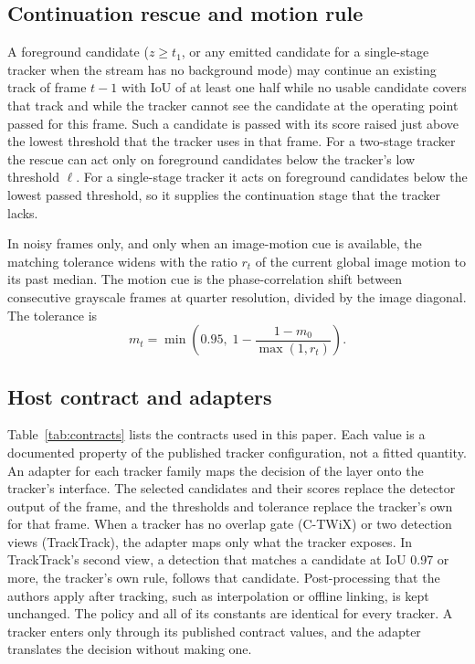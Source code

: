 \subsection{Continuation rescue and motion rule}\label{sec:rescue}
A foreground candidate ($z\ge t_1$, or any emitted candidate for a
single-stage tracker when the stream has no background mode) may continue an
existing track of frame $t-1$ with IoU of at least one half while no usable candidate covers that
track and while the tracker cannot see the candidate at the operating point
passed for this frame. Such a candidate is passed with its score raised just
above the lowest threshold that the tracker uses in that frame. For a
two-stage tracker the rescue can act only on foreground candidates below the
tracker's low threshold $\ell$. For a single-stage tracker it acts on
foreground candidates below the lowest passed threshold, so it supplies the
continuation stage that the tracker lacks.

In noisy frames only, and only when an image-motion cue is available, the
matching tolerance widens with the ratio $r_t$ of the current global image
motion to its past median. The motion cue is the phase-correlation shift
\cite{reddy1996phasecorr} between consecutive grayscale frames at quarter
resolution, divided by the image diagonal. The tolerance is
\begin{equation}
m_t=\min\!\left(0.95,\;1-\frac{1-m_0}{\max(1,r_t)}\right).
\label{eq:motion}
\end{equation}

\subsection{Host contract and adapters}\label{sec:contract}
Table~\ref{tab:contracts} lists the contracts used in this paper. Each value
is a documented property of the published tracker configuration, not a fitted
quantity. An adapter for each tracker family maps the decision of the layer
onto the tracker's interface. The selected candidates and their scores replace
the detector output of the frame, and the thresholds and tolerance replace the
tracker's own for that frame. When a tracker has no overlap gate (C-TWiX) or
two detection views (TrackTrack), the adapter maps only what the tracker
exposes. In TrackTrack's second view, a detection that matches a candidate at
IoU 0.97 or more, the tracker's own rule, follows that candidate.
Post-processing that the authors apply after tracking, such as interpolation
or offline linking, is kept unchanged. The policy and all of its constants are
identical for every tracker. A tracker enters only through its published
contract values, and the adapter translates the decision without making one.

